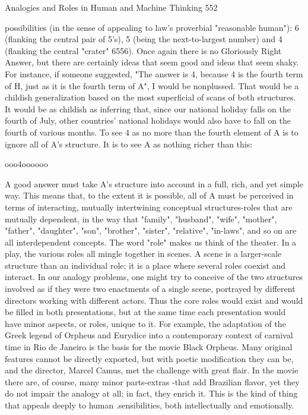 Analogies and Roles in Human and Machine Thinking                                     552

possibilities (in the sense of appealing to law's proverbial "reasonable human"): 6
(flanking the central pair of 5's), 5 (being the next-to-largest number) and 4 (flanking
the central "crater" 6556). Once again there is no Gloriously Right Answer, but there
are certainly ideas that seem good and ideas that seem shaky. For instance, if someone
suggested, "The answer is 4, because 4 is the fourth term of H, just as it is the fourth
term of A", I would be nonplussed. That would be a childish generalization based on
the most superficial of scans of both structures. It would be as childish as inferring
that, since our national holiday falls on the fourth of July, other countries' national
holidays would also have to fall on the fourth of various months. To see 4 as no more
than the fourth element of A is to ignore all of A's structure. It is to see A as nothing
richer than this:

               ooo4oooooo

A good answer must take A's structure into account in a full, rich, and yet simple way.
This means that, to the extent it is possible, all of A must be perceived in terms of
interacting, mutually intertwining conceptual structures-roles that are mutually
dependent, in the way that "family", "husband", "wife", "mother", "father",
"daughter", "son", "brother", "sister", "relative", "in-laws", and so on are all
interdependent concepts.
        The word "role" makes us think of the theater. In a play, the various roles all
mingle together in scenes. A scene is a larger-scale structure than an individual role; it
is a place where several roles coexist and interact. In our analogy problems, one might
try to conceive of the two structures involved as if they were two enactments of a
single scene, portrayed by different directors working with different actors. Thus the
core roles would exist and would be filled in both presentations, but at the same time
each presentation would have minor aspects, or roles, unique to it. For example, the
adaptation of the Greek legend of Orpheus and Eurydice into a contemporary context
of carnival time in Rio de Janeiro is the basis for the movie Black Orpheus. Many
original features cannot be directly exported, but with poetic modification they can be,
and the director, Marcel Camus, met the challenge with great flair. In the movie there
are, of course, many minor parts-extras -that add Brazilian flavor, yet they do not
impair the analogy at all; in fact, they enrich it. This is the kind of thing that appeals
deeply to human .sensibilities, both intellectually and emotionally.

